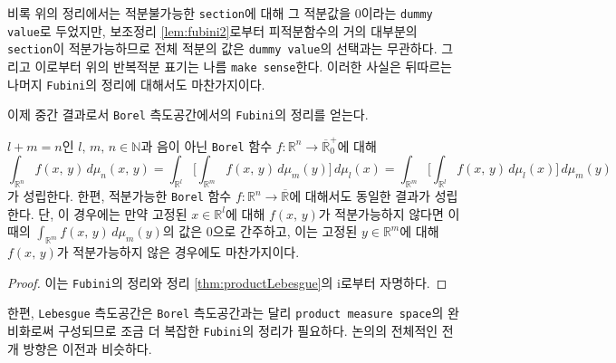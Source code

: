 비록 위의 정리에서는 적분불가능한 \texttt{section}에 대해 그 적분값을 0이라는 \texttt{dummy value}로 두었지만, 보조정리 \ref{lem:fubini2}로부터 피적분함수의 거의 대부분의 \texttt{section}이 적분가능하므로 전체 적분의 값은 \texttt{dummy value}의 선택과는 무관하다. 그리고 이로부터 위의 반복적분 표기는 나름 \texttt{make sense}한다. 이러한 사실은 뒤따르는 나머지 \texttt{Fubini}의 정리에 대해서도 마찬가지이다.

이제 중간 결과로서 \texttt{Borel} 측도공간에서의 \texttt{Fubini}의 정리를 얻는다.

\begin{corollary}
    $l+m=n$인 $l,\,m,\,n\in\mathbb{N}$과 음이 아닌 \texttt{Borel} 함수 $f:\mathbb{R}^n\to\overline{\mathbb{R}}^+_0$에 대해
    \begin{equation*}
        \int_{\mathbb{R}^n}f(x,\,y)\,d\mu_n(x,\,y)=\int_{\mathbb{R}^l}\bigg[\int_{\mathbb{R}^m}f(x,\,y)\,d\mu_m(y)\bigg]\,d\mu_l(x)=\int_{\mathbb{R}^m}\bigg[\int_{\mathbb{R}^l}f(x,\,y)\,d\mu_l(x)\bigg]\,d\mu_m(y)
    \end{equation*}
    가 성립한다. 한편, 적분가능한 \texttt{Borel} 함수 $f:\mathbb{R}^n\to\overline{\mathbb{R}}$에 대해서도 동일한 결과가 성립한다. 단, 이 경우에는 만약 고정된 $x\in\mathbb{R}^l$에 대해 $f(x,\,y)$가 적분가능하지 않다면 이때의 $\int_{\mathbb{R}^m}f(x,\,y)\,d\mu_m(y)$의 값은 0으로 간주하고, 이는 고정된 $y\in\mathbb{R}^m$에 대해 $f(x,\,y)$가 적분가능하지 않은 경우에도 마찬가지이다.
\end{corollary}

\begin{proof}
    이는 \texttt{Fubini}의 정리와 정리 \ref{thm:productLebesgue}의 i로부터 자명하다.
\end{proof}

한편, \texttt{Lebesgue} 측도공간은 \texttt{Borel} 측도공간과는 달리 \texttt{product measure space}의 완비화로써 구성되므로 조금 더 복잡한 \texttt{Fubini}의 정리가 필요하다. 논의의 전체적인 전개 방향은 이전과 비슷하다.

